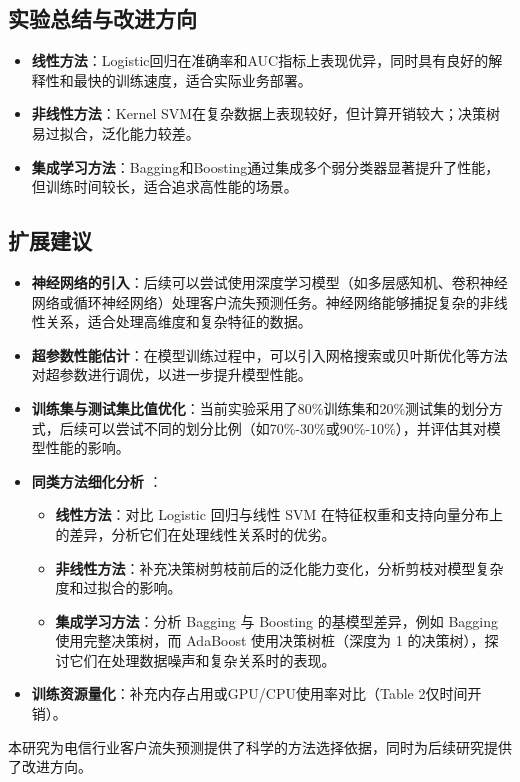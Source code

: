 \documentclass{article}
\begin{document}
\subsection{实验总结与改进方向}
\begin{itemize}
    \item \textbf{线性方法}：Logistic回归在准确率和AUC指标上表现优异，同时具有良好的解释性和最快的训练速度，适合实际业务部署。
    \item \textbf{非线性方法}：Kernel SVM在复杂数据上表现较好，但计算开销较大；决策树易过拟合，泛化能力较差。
    \item \textbf{集成学习方法}：Bagging和Boosting通过集成多个弱分类器显著提升了性能，但训练时间较长，适合追求高性能的场景。
\end{itemize}

\subsection{扩展建议}
\begin{itemize}
    \item \textbf{神经网络的引入}：后续可以尝试使用深度学习模型（如多层感知机、卷积神经网络或循环神经网络）处理客户流失预测任务。神经网络能够捕捉复杂的非线性关系，适合处理高维度和复杂特征的数据。
    \item \textbf{超参数性能估计}：在模型训练过程中，可以引入网格搜索或贝叶斯优化等方法对超参数进行调优，以进一步提升模型性能。
    \item \textbf{训练集与测试集比值优化}：当前实验采用了80\%训练集和20\%测试集的划分方式，后续可以尝试不同的划分比例（如70\%-30\%或90\%-10\%），并评估其对模型性能的影响。
    \item \textbf{同类方法细化分析 }：
            \begin{itemize}
                \item \textbf{线性方法}：对比 Logistic 回归与线性 SVM 在特征权重和支持向量分布上的差异，分析它们在处理线性关系时的优劣。
                \item \textbf{非线性方法}：补充决策树剪枝前后的泛化能力变化，分析剪枝对模型复杂度和过拟合的影响。
                \item \textbf{集成学习方法}：分析 Bagging 与 Boosting 的基模型差异，例如 Bagging 使用完整决策树，而 AdaBoost 使用决策树桩（深度为 1 的决策树），探讨它们在处理数据噪声和复杂关系时的表现。
            \end{itemize}
    \item \textbf{训练资源量化}：补充内存占用或GPU/CPU使用率对比（Table 2仅时间开销）。
\end{itemize}

本研究为电信行业客户流失预测提供了科学的方法选择依据，同时为后续研究提供了改进方向。


\end{document}
